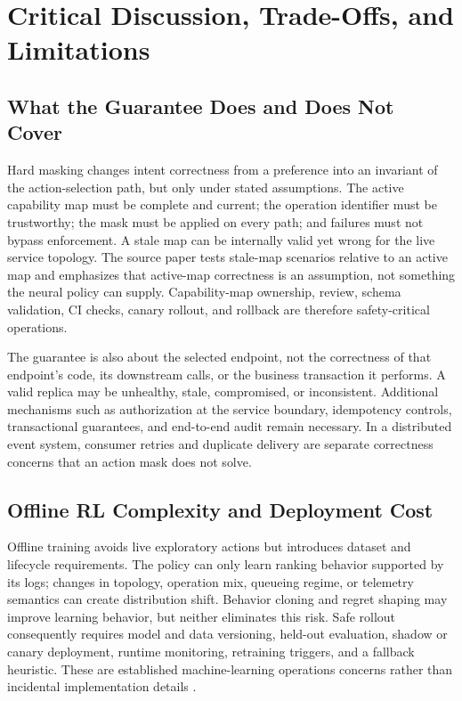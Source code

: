 \documentclass[conference]{IEEEtran}
\begin{document}
\section{Critical Discussion, Trade-Offs, and Limitations}
\subsection{What the Guarantee Does and Does Not Cover}
Hard masking changes intent correctness from a preference into an invariant of the action-selection path, but only under stated assumptions. The active capability map must be complete and current; the operation identifier must be trustworthy; the mask must be applied on every path; and failures must not bypass enforcement. A stale map can be internally valid yet wrong for the live service topology. The source paper tests stale-map scenarios relative to an active map and emphasizes that active-map correctness is an assumption, not something the neural policy can supply. Capability-map ownership, review, schema validation, CI checks, canary rollout, and rollback are therefore safety-critical operations.

The guarantee is also about the selected endpoint, not the correctness of that endpoint's code, its downstream calls, or the business transaction it performs. A valid replica may be unhealthy, stale, compromised, or inconsistent. Additional mechanisms such as authorization at the service boundary, idempotency controls, transactional guarantees, and end-to-end audit remain necessary. In a distributed event system, consumer retries and duplicate delivery are separate correctness concerns that an action mask does not solve.

\subsection{Offline RL Complexity and Deployment Cost}
Offline training avoids live exploratory actions but introduces dataset and lifecycle requirements. The policy can only learn ranking behavior supported by its logs; changes in topology, operation mix, queueing regime, or telemetry semantics can create distribution shift. Behavior cloning and regret shaping may improve learning behavior, but neither eliminates this risk. Safe rollout consequently requires model and data versioning, held-out evaluation, shadow or canary deployment, runtime monitoring, retraining triggers, and a fallback heuristic. These are established machine-learning operations concerns rather than incidental implementation details \cite{kreuzberger2023,sculley2015}.
\end{document}
